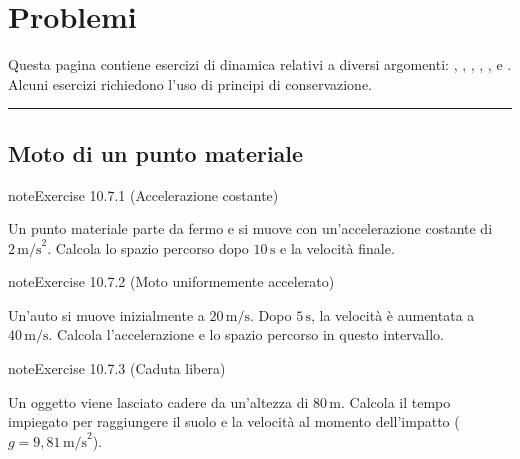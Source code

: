 \documentclass[letterpaper,10pt,italian]{jupyterBook}
\begin{document}
\section{Problemi}
\label{\detokenize{ch/mechanics/dynamics-problems:problemi}}\label{\detokenize{ch/mechanics/dynamics-problems::doc}}
\sphinxAtStartPar
Questa pagina contiene esercizi di dinamica relativi a diversi argomenti: , , , , ,  e . Alcuni esercizi richiedono l’uso di principi di conservazione.


\bigskip\hrule\bigskip



\subsection{Moto di un punto materiale}
\label{\detokenize{ch/mechanics/dynamics-problems:moto-di-un-punto-materiale}} \label{exercise:ch/mechanics/dynamics-problems-exercise-0}

\begin{sphinxadmonition}{note}{Exercise 10.7.1 (Accelerazione costante)}



\sphinxAtStartPar
Un punto materiale parte da fermo e si muove con un’accelerazione costante di \(2 \, \text{m/s}^2\). Calcola lo spazio percorso dopo \(10 \, \text{s}\) e la velocità finale.
\end{sphinxadmonition}
 \label{exercise:ch/mechanics/dynamics-problems-exercise-1}

\begin{sphinxadmonition}{note}{Exercise 10.7.2 (Moto uniformemente accelerato)}



\sphinxAtStartPar
Un’auto si muove inizialmente a \(20 \, \text{m/s}\). Dopo \(5 \, \text{s}\), la velocità è aumentata a \(40 \, \text{m/s}\). Calcola l’accelerazione e lo spazio percorso in questo intervallo.
\end{sphinxadmonition}
 \label{exercise:ch/mechanics/dynamics-problems-exercise-2}

\begin{sphinxadmonition}{note}{Exercise 10.7.3 (Caduta libera)}



\sphinxAtStartPar
Un oggetto viene lasciato cadere da un’altezza di \(80 \, \text{m}\). Calcola il tempo impiegato per raggiungere il suolo e la velocità al momento dell’impatto (\(g = 9,81 \, \text{m/s}^2\)).
\end{sphinxadmonition}
 \label{exercise:ch/mechanics/dynamics-problems-exercise-3}
\end{document}

